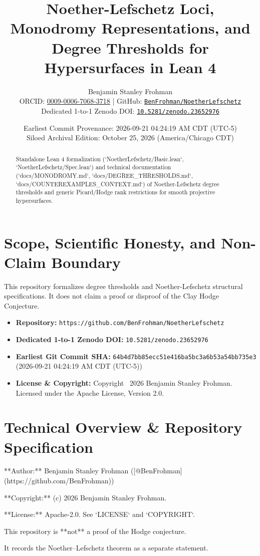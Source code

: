 \documentclass[11pt,a4paper]{article}
\title{\textbf{Noether-Lefschetz Loci, Monodromy Representations, and Degree Thresholds for Hypersurfaces in Lean 4}}
\author{Benjamin Stanley Frohman\\
\small ORCID: \href{https://orcid.org/0009-0006-7068-3718}{0009-0006-7068-3718} \quad|\quad
GitHub: \href{https://github.com/BenFrohman/NoetherLefschetz}{\texttt{BenFrohman/NoetherLefschetz}}\\
\small Dedicated 1-to-1 Zenodo DOI: \href{https://doi.org/10.5281/zenodo.23652976}{\texttt{10.5281/zenodo.23652976}}}
\date{Earliest Commit Provenance: 2026-09-21 04:24:19 AM CDT (UTC-5)\\
Siloed Archival Edition: October 25, 2026 (America/Chicago CDT)}
\begin{document}
\maketitle

\begin{abstract}
Standalone Lean 4 formalization (`NoetherLefschetz/Basic.lean`, `NoetherLefschetz/Spec.lean`) and technical documentation (`docs/MONODROMY.md`, `docs/DEGREE\_THRESHOLDS.md`, `docs/COUNTEREXAMPLES\_CONTEXT.md`) of Noether-Lefschetz degree thresholds and generic Picard/Hodge rank restrictions for smooth projective hypersurfaces.
\end{abstract}

\section{Scope, Scientific Honesty, and Non-Claim Boundary}
This repository formalizes degree thresholds and Noether-Lefschetz structural specifications. It does not claim a proof or disproof of the Clay Hodge Conjecture.

\begin{itemize}
  \item \textbf{Repository:} \texttt{https://github.com/BenFrohman/NoetherLefschetz}
  \item \textbf{Dedicated 1-to-1 Zenodo DOI:} \texttt{10.5281/zenodo.23652976}
  \item \textbf{Earliest Git Commit SHA:} \texttt{64b4d7bb85ecc51e416ba5bc3a6b53a54bb735e3} (2026-09-21 04:24:19 AM CDT (UTC-5))
  \item \textbf{License \& Copyright:} Copyright \textcopyright\ 2026 Benjamin Stanley Frohman. Licensed under the Apache License, Version 2.0.
\end{itemize}

\section{Technical Overview \& Repository Specification}
**Author:** Benjamin Stanley Frohman ([@BenFrohman](https://github.com/BenFrohman))

**Copyright:** (c) 2026 Benjamin Stanley Frohman.

**License:** Apache-2.0. See `LICENSE` and `COPYRIGHT`.

This repository is **not** a proof of the Hodge conjecture.

It records the Noether–Lefschetz theorem as a separate statement.
\end{document}

